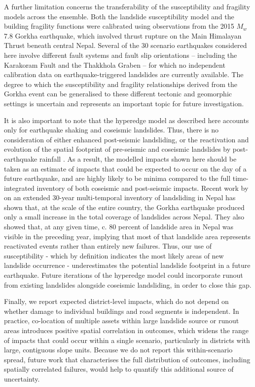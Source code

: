 \documentclass[preprint,12pt,authoryear]{elsarticle}
\begin{document}
A further limitation concerns the transferability of the susceptibility and fragility models across the ensemble. Both the landslide susceptibility model and the building fragility functions were calibrated using observations from the 2015 $M_w$ 7.8 Gorkha earthquake, which involved thrust rupture on the Main Himalayan Thrust beneath central Nepal. Several of the 30 scenario earthquakes considered here involve different fault systems and fault slip orientations -- including the Karakoram Fault and the Thakkhola Graben -- for which no independent calibration data on earthquake-triggered landslides are currently available. The degree to which the susceptibility and fragility relationships derived from the Gorkha event can be generalised to these different tectonic and geomorphic settings is uncertain and represents an important topic for future investigation.

It is also important to note that the hyperedge model as described here accounts only for earthquake shaking and coseismic landslides. Thus, there is no consideration of either enhanced post-seismic landsliding, or the reactivation and evolution of the spatial footprint of pre-seismic and coseismic landslides by post-earthquake rainfall \citep{Kincey2021,Kincey2023,Shrestha2026}. As a result, the modelled impacts shown here should be taken as an estimate of impacts that could be expected to occur on the day of a future earthquake, and are highly likely to be minima compared to the full time-integrated inventory of both coseismic and post-seismic impacts. Recent work by \citet{Harvey2026} on an extended 30-year multi-temporal inventory of landsliding in Nepal has shown that, at the scale of the entire country, the Gorkha earthquake produced only a small increase in the total coverage of landslides across Nepal. They also showed that, at any given time, c. 80 percent of landslide area in Nepal was visible in the preceding year, implying that most of that landslide area represents reactivated events rather than entirely new failures. Thus, our use of susceptibility - which by definition indicates the most likely areas of new landslide occurrence - underestimates the potential landslide footprint in a future earthquake. Future iterations of the hyperedge model could incorporate runout from existing landslides \citep[e.g.,][]{Kincey2023} alongside coseismic landsliding, in order to close this gap.

Finally, we report expected district-level impacts, which do not depend on whether damage to individual buildings and road segments is independent. In practice, co-location of multiple assets within large landslide source or runout areas introduces positive spatial correlation in outcomes, which widens the range of impacts that could occur within a single scenario, particularly in districts with large, contiguous slope units. Because we do not report this within-scenario spread, future work that characterises the full distribution of outcomes, including spatially correlated failures, would help to quantify this additional source of uncertainty.
\end{document}
